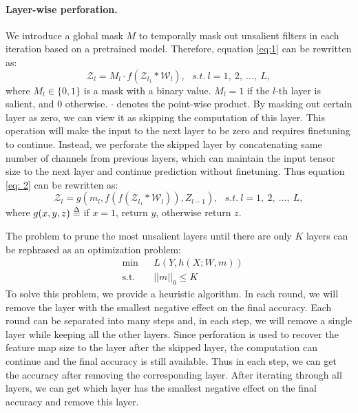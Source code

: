 \documentclass[pageno]{jpaper}
\def\delequal{\mathrel{\ensurestackMath{\stackon[1pt]{=}{\scriptstyle\Delta}}}}
\begin{document}
\paragraph{Layer-wise perforation.}
We introduce a global mask $M$ to temporally mask out unsalient filters in each iteration based on a pretrained model. Therefore, equation \ref{eq:1} can be rewritten as:
\begin{equation} \label{eq: 2}
    \mathcal{Z}_l = M_l \cdot f(\mathcal{Z}_{l_1} \ast \mathcal{W}_l), \ \ \  s.t. \: l = 1,\: 2, \: \dots, \: L,
\end{equation}
where $M_l \in \{0, 1\}$ is a mask with a binary value. $M_l = 1$ if the $l$-th layer is salient, and $0$ otherwise. $\cdot$ denotes the point-wise product. By masking out certain layer as zero, we can view it as skipping the computation of this layer. This operation will make the input to the next layer to be zero and requires finetuning to continue. Instead, we perforate the skipped layer by concatenating same number of channels from previous layers, which can maintain the input tensor size to the next layer and continue prediction without finetuning. Thus equation \ref{eq: 2} can be rewritten as:
\begin{equation}
    \mathcal{Z}_l = g(m_l, f(f(\mathcal{Z}_{l_1} \ast \mathcal{W}_l)), Z_{l-1}), \ \ \  s.t. \: l = 1,\: 2, \: \dots, \: L,
\end{equation}
where $g(x,y,z)  \delequal \; $if $x = 1$, return $y$, otherwise return $z$.

The problem to prune the most unsalient layers until there are only $K$ layers can be rephrased as an optimization problem:
\begin{equation*}
\begin{aligned}
& {\text{min}}
& & L(Y, h(X; W, m)) \\
& \text{s.t.}
& & ||m||_0 \leq K
\end{aligned}
\end{equation*}
To solve this problem, we provide a heuristic algorithm. In each round, we will remove the layer with the smallest negative effect on the final accuracy. Each round can be separated into many steps and, in each step, we will remove a single layer while keeping all the other layers. Since perforation is used to recover the feature map size to the layer after the skipped layer, the computation can continue and the final accuracy is still available. Thus in each step, we can get the accuracy after removing the corresponding layer. After iterating through all layers, we can get which layer has the smallest negative effect on the final accuracy and remove this layer.
\end{document}
